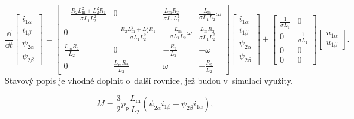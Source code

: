 \documentclass[a4paper, twoside, 11pt]{article}
\begin{document}
\begin{equation}
    \frac{\dd{}}{\dd{t}}
    \begin{bmatrix}
        i_{1\alpha}\\
        i_{1\beta}\\
        \psi_{2\alpha}\\
        \psi_{2\beta}
    \end{bmatrix}
    =
    \begin{bmatrix}
        -\frac{R_2 L_\text{m}^{2} + L_2^2 R_1}{\sigma L_1 L_2^2} & 0 & \frac{L_\text{m} R_2}{\sigma L_1 L_2^2} & \frac{L_\text{m}}{\sigma L_1 L_2} \omega\\
        0 & - \frac{R_2 L_\text{m}^2 + L_2^2 R_1}{\sigma L_1 L_2^2} & - \frac{L_\text{m}}{\sigma L_1 L_2} \omega & \frac{L_\text{m} R_2}{\sigma L_1 L_2^2}\\
        \frac{L_\text{m} R_2}{L_2} & 0 & - \frac{R_2}{L_2} & -\omega\\
        0 & \frac{L_\text{m} R_2}{L_2} & \omega & -\frac{R_2}{L_2}
    \end{bmatrix}
    \begin{bmatrix}
        i_{1\alpha}\\
        i_{1\beta}\\
        \psi_{2\alpha}\\
        \psi_{2\beta}
    \end{bmatrix}
    +
    \begin{bmatrix}
        \frac{1}{\sigma L_1} & 0\\
        0 & \frac{1}{\sigma L_1}\\
        0 & 0\\
        0 & 0
    \end{bmatrix}
    \begin{bmatrix}
        u_{1\alpha}\\
        u_{1\beta}
    \end{bmatrix}.
\end{equation}
Stavový popis je vhodné doplnit o~další rovnice, jež budou v~simulaci využity.

\begin{equation}
    M = \frac{3}{2} p_\text{p} \frac{L_\text{m}}{L_2} (\psi_{2\alpha} i_{1\beta} - \psi_{2\beta} i_{1\alpha}),
\end{equation}
\end{document}
